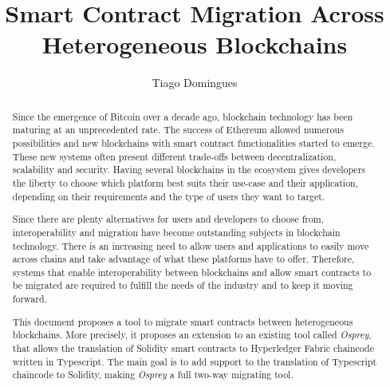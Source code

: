 \documentclass[runningheads]{llncs}
\begin{document}
\title{Smart Contract Migration Across Heterogeneous Blockchains}
\author{Tiago Domingues\\}


\let\oldaddcontentsline\addcontentsline
\def\addcontentsline#1#2#3{}

\maketitle

\noindent {}

\def\addcontentsline#1#2#3{\oldaddcontentsline{#1}{#2}{#3}}

\begin{abstract}
Since the emergence of Bitcoin over a decade ago, blockchain technology has been maturing at an unprecedented rate. The success of Ethereum allowed numerous possibilities and new blockchains with smart contract functionalities started to emerge. These new systems often present different trade-offs between decentralization, scalability and security. Having several blockchains in the ecosystem gives developers the liberty to choose which platform best suits their use-case and their application, depending on their requirements and the type of users they want to target. 

Since there are plenty alternatives for users and developers to choose from, interoperability and migration have become outstanding subjects in blockchain technology. There is an increasing need to allow users and applications to easily move across chains and take advantage of what these platforms have to offer. Therefore, systems that enable interoperability between blockchains and allow smart contracts to be migrated are required to fulfill the needs of the industry and to keep it moving forward.

This document proposes a tool to migrate smart contracts between heterogeneous blockchains. More precisely, it proposes an extension to an existing tool called \textit{Osprey}, that allows the translation of Solidity smart contracts to Hyperledger Fabric chaincode written in Typescript. The main goal is to add support to the translation of Typescript chaincode to Solidity, making \textit{Osprey} a full two-way migrating tool.

\end{abstract}
\end{document}
